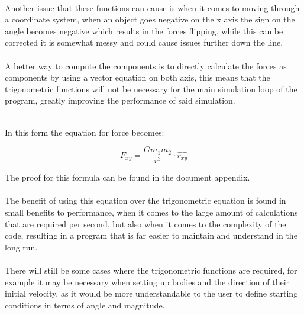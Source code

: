 \paragraph{}
Another issue that these functions can cause is when it comes to moving through a coordinate system, when an object goes negative on the x axis the sign on the angle becomes negative which results in the forces flipping, while this can be corrected it is somewhat messy and could cause issues further down the line.

\paragraph{}
A better way to compute the components is to directly calculate the forces as components by using a vector equation on both axis, this means that the trigonometric functions will not be necessary for the main simulation loop of the program, greatly improving the performance of said simulation.\\\

In this form the equation for force becomes:

$$F_{xy}=\frac{Gm_1m_2}{r^3} \cdot \hat{r_{xy}}$$

The proof for this formula can be found in the document appendix.

\paragraph{}
The benefit of using this equation over the trigonometric equation is found in small benefits to performance, when it comes to the large amount of calculations that are required per second, but also when it comes to the complexity of the code, resulting in a program that is far easier to maintain and understand in the long run.

\paragraph{}
There will still be some cases where the trigonometric functions are required, for example it may be necessary when setting up bodies and the direction of their initial velocity, as it would be more understandable to the user to define starting conditions in terms of angle and magnitude.




























